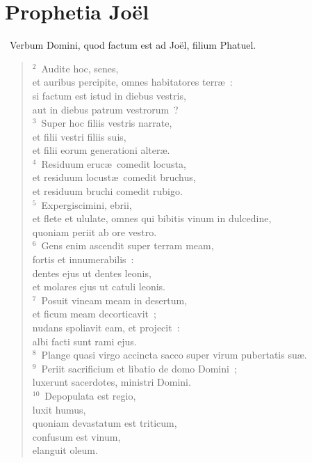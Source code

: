 {\centering \section*{Prophetia Joël}}\thispagestyle{empty}

~\lettrine[lines=10,image=true,loversize=0.05,lraise=-0.03]{V}{}erbum Domini, quod factum est ad Jo\"el, filium Phatuel.
\begin{flushleft}\begin{verse}\vspace{6pt}${}^{2}$~Audite hoc, senes,\\ et auribus percipite, omnes habitatores terr\ae~:\\ si factum est istud in diebus vestris,\\ aut in diebus patrum vestrorum~?\\
${}^{3}$~Super hoc filiis vestris narrate,\\ et filii vestri filiis suis,\\ et filii eorum generationi alter\ae .\\
${}^{4}$~Residuum eruc\ae\ comedit locusta,\\ et residuum locust\ae\ comedit bruchus,\\ et residuum bruchi comedit rubigo.\\
${}^{5}$~Expergiscimini, ebrii,\\ et flete et ululate, omnes qui bibitis vinum in dulcedine,\\ quoniam periit ab ore vestro.\\
${}^{6}$~Gens enim ascendit super terram meam,\\ fortis et innumerabilis~:\\ dentes ejus ut dentes leonis,\\ et molares ejus ut catuli leonis.\\
${}^{7}$~Posuit vineam meam in desertum,\\ et ficum meam decorticavit~;\\ nudans spoliavit eam, et projecit~:\\ albi facti sunt rami ejus.\\
${}^{8}$~Plange quasi virgo accincta sacco super virum pubertatis su\ae .\\
${}^{9}$~Periit sacrificium et libatio de domo Domini~;\\ luxerunt sacerdotes, ministri Domini.\\
${}^{10}$~Depopulata est regio,\\ luxit humus,\\ quoniam devastatum est triticum,\\ confusum est vinum,\\ elanguit oleum.\\

\end{verse}
\end{flushleft}
